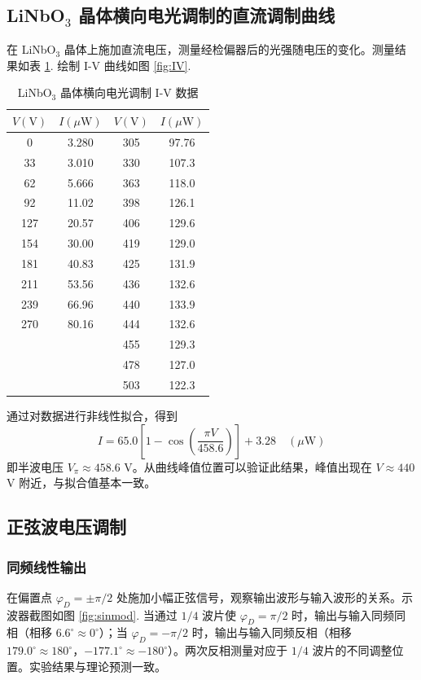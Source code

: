 \documentclass[utf8,twocolumn]{ctexart}
\begin{document}
\subsection{LiNbO$_3$ 晶体横向电光调制的直流调制曲线}
在 LiNbO$_3$ 晶体上施加直流电压，测量经检偏器后的光强随电压的变化。测量结果如表 \ref{tab:IV}. 绘制 I-V 曲线如图 \ref{fig:IV}.
\begin{table}[H]
    \centering
    \begin{tabular}{cc|cc}
        \toprule
        $V (\text{V})$ & $I (\mu\text{W})$ & $V (\text{V})$ & $I (\mu\text{W})$ \\
        \midrule
        0   & 3.280  & 305 & 97.76  \\
        33  & 3.010  & 330 & 107.3  \\
        62  & 5.666  & 363 & 118.0  \\
        92  & 11.02  & 398 & 126.1  \\
        127 & 20.57  & 406 & 129.6  \\
        154 & 30.00  & 419 & 129.0  \\
        181 & 40.83  & 425 & 131.9  \\
        211 & 53.56  & 436 & 132.6  \\
        239 & 66.96  & 440 & 133.9  \\
        270 & 80.16  & 444 & 132.6  \\
            &        & 455 & 129.3  \\
            &        & 478 & 127.0  \\
            &        & 503 & 122.3  \\
        \bottomrule
    \end{tabular}
    \caption{LiNbO$_3$ 晶体横向电光调制 I-V 数据}
    \label{tab:IV}
\end{table}
通过对数据进行非线性拟合，得到
\begin{equation}
    I = 65.0\left[1 - \cos\!\left(\frac{\pi V}{458.6}\right)\right] + 3.28 \quad (\mu\text{W})
\end{equation}
即半波电压 $V_\pi \approx 458.6$ V。从曲线峰值位置可以验证此结果，峰值出现在 $V \approx 440$ V 附近，与拟合值基本一致。

\subsection{正弦波电压调制}

\subsubsection{同频线性输出}
在偏置点 $\varphi_D = \pm\pi/2$ 处施加小幅正弦信号，观察输出波形与输入波形的关系。示波器截图如图 \ref{fig:sinmod}.
当通过 $1/4$ 波片使 $\varphi_D = \pi/2$ 时，输出与输入同频同相（相移 $6.6^\circ \approx 0^\circ$）；当 $\varphi_D = -\pi/2$ 时，输出与输入同频反相（相移 $179.0^\circ \approx 180^\circ$，$-177.1^\circ \approx -180^\circ$）。两次反相测量对应于 $1/4$ 波片的不同调整位置。实验结果与理论预测一致。
\end{document}
